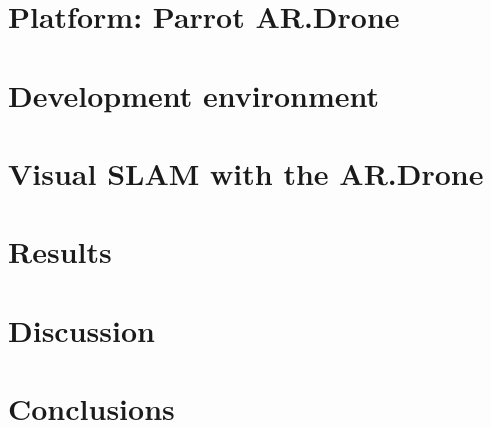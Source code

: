 \documentclass[twoside]{uva-bachelor-thesis}
\begin{document}
\chapter{Platform: Parrot AR.Drone}
\label{chapter:platform}




\chapter{Development environment}
\label{chapter:development-environment}




\chapter{Visual SLAM with the AR.Drone}
\label{chapter:visual-slam}




\chapter{Results}
\label{chapter:results}




\chapter{Discussion}
\label{chapter:discussion}




\chapter{Conclusions}
\label{chapter:conclusions}




\appendix


\linespread{1.0}

%

\end{document}
